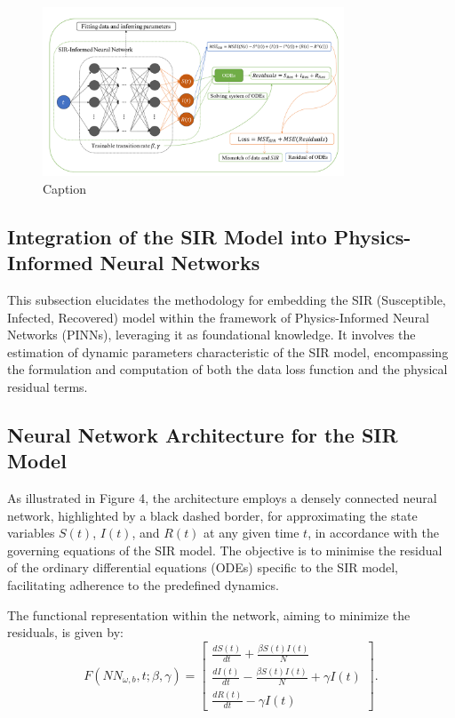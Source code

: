 \documentclass[12pt]{article}
\begin{document}
\begin{figure}
    \centering
    \includegraphics[width=0.8\textwidth]{images/image.png}
    \caption{Caption}
    \label{fig:enter-label}
\end{figure}

\subsection{Integration of the SIR Model into Physics-Informed Neural Networks}
This subsection elucidates the methodology for embedding the SIR (Susceptible, Infected, Recovered) model within the framework of Physics-Informed Neural Networks (PINNs), leveraging it as foundational knowledge. It involves the estimation of dynamic parameters characteristic of the SIR model, encompassing the formulation and computation of both the data loss function and the physical residual terms.

\subsection{Neural Network Architecture for the SIR Model}
As illustrated in Figure 4, the architecture employs a densely connected neural network, highlighted by a black dashed border, for approximating the state variables \(S(t)\), \(I(t)\), and \(R(t)\) at any given time \(t\), in accordance with the governing equations of the SIR model. The objective is to minimise the residual of the ordinary differential equations (ODEs) specific to the SIR model, facilitating adherence to the predefined dynamics.

The functional representation within the network, aiming to minimize the residuals, is given by:
\begin{equation}
    F(NN_{\omega,b}, t; \beta, \gamma) = \left[ \begin{array}{c}
        \frac{dS(t)}{dt} + \frac{\beta S(t)I(t)}{N} \\
        \frac{dI(t)}{dt} - \frac{\beta S(t)I(t)}{N} + \gamma I(t) \\
        \frac{dR(t)}{dt} - \gamma I(t)
    \end{array} \right].
\end{equation}
\end{document}
